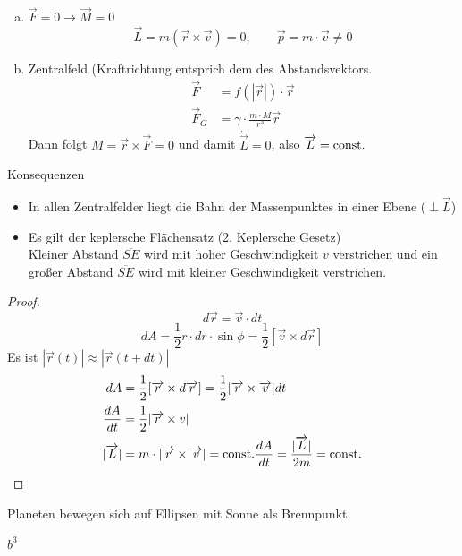 \documentclass[a4paper,10pt]{scrartcl}
\begin{document}
\begin{enumerate}[a)]
 \item $\vec F=0 \to \vec M=0$\\
\[
 \vec L= m(\vec r \times \vec v)=0, \qquad \vec p =m\cdot \vec v \neq 0
\]
\item Zentralfeld (Kraftrichtung entsprich dem des Abstandsvektors.\\
\begin{align*}
 \vec F&= f(|\vec r|)\cdot \vec r\\
 \vec F_G&= \gamma \cdot \frac{m\cdot M}{r^3} \vec r
\end{align*}
Dann folgt $M=\vec r \times \vec F=0$ und damit $\dot{\vec L}=0$, also $\overrightarrow{L}=\text{const}.$
\end{enumerate}
\begin{seg}{Konsequenzen}
 \begin{itemize}
  \item In allen Zentralfelder liegt die Bahn der Massenpunktes in einer Ebene ($\perp \vec L$)
  \item Es gilt der keplersche Flächensatz (2. Keplersche Gesetz)\\
 Kleiner Abstand $\overline{SE}$ wird mit hoher Geschwindigkeit $v$ verstrichen und ein großer Abstand $\overline{SE}$ wird mit kleiner Geschwindigkeit verstrichen. 
 \end{itemize}
\end{seg}
\begin{proof}
\[
 d\vec r= \vec v \cdot dt
\]
\[
 dA=\frac{1}{2} r \cdot dr\cdot \sin \phi= \frac{1}{2}[\vec v \times d\vec r]
\]
Es ist $|\vec r(t)|\approx|\vec r(t+dt)|$
\begin{align*}
 dA&=\frac{1}{2}[\overrightarrow{r} \times d \overrightarrow{r}]= \frac{1}{2}|\overrightarrow{r} \times \overrightarrow{v}| dt\\
\frac{dA}{dt}&= \frac{1}{2}|\overrightarrow{r} \times v|\\
|\overrightarrow{L}|&= m\cdot |\overrightarrow{r} \times \overrightarrow{v}|=\text{const}.
\frac{dA}{dt}=\frac{|\overrightarrow{L}|}{2m}=\text{const}.
\end{align*}
\fixme[überprüfen]
\end{proof}
\begin{st}
 Planeten bewegen sich auf Ellipsen mit Sonne als Brennpunkt.
\end{st}
\begin{st}
  $b^3$
\end{st}
\end{document}
